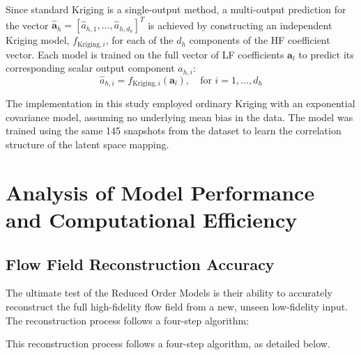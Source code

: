 \documentclass[tg, EN]{ufabcFHZh_tg}
\begin{document}
Since standard Kriging is a single-output method, a multi-output prediction for the vector $\hat{\mathbf{a}}_h = [\hat{a}_{h,1}, \dots, \hat{a}_{h,d_h}]^T$ is achieved by constructing an independent Kriging model, $f_{\text{Kriging}, i}$, for each of the $d_h$ components of the HF coefficient vector. Each model is trained on the full vector of LF coefficients $\mathbf{a}_l$ to predict its corresponding scalar output component $a_{h,i}$:
\begin{equation}
    \hat{a}_{h,i} = f_{\text{Kriging}, i}(\mathbf{a}_l), \quad \text{for } i=1, \dots, d_h
\end{equation}

The implementation in this study employed ordinary Kriging with an exponential covariance model, assuming no underlying mean bias in the data. The model was trained using the same 145 snapshots from the dataset to learn the correlation structure of the latent space mapping.


\chapter{Analysis of Model Performance and Computational Efficiency}
\label{chap:results_discussion}

\section{Flow Field Reconstruction Accuracy}

The ultimate test of the Reduced Order Models is their ability to accurately reconstruct the full high-fidelity flow field from a new, unseen low-fidelity input. The reconstruction process follows a four-step algorithm:

This reconstruction process follows a four-step algorithm, as detailed below.
\end{document}
